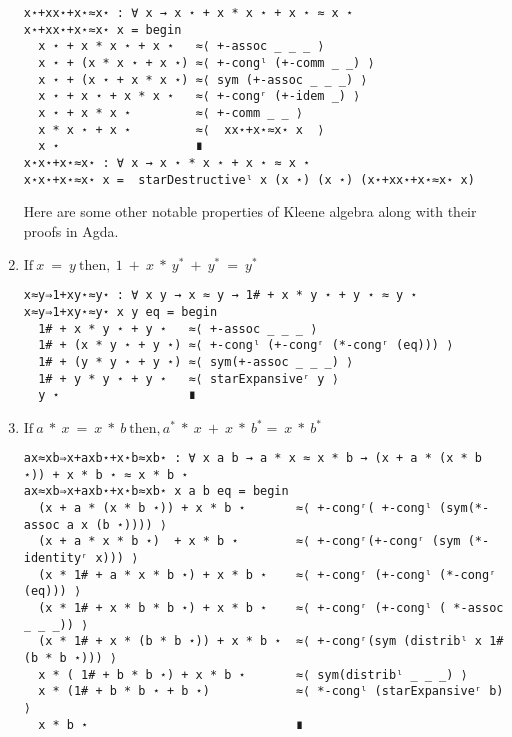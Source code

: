 \begin{enumerate}
\begin{verbatim}
x⋆+xx⋆+x⋆≈x⋆ : ∀ x → x ⋆ + x * x ⋆ + x ⋆ ≈ x ⋆
x⋆+xx⋆+x⋆≈x⋆ x = begin
  x ⋆ + x * x ⋆ + x ⋆   ≈⟨ +-assoc _ _ _ ⟩ 
  x ⋆ + (x * x ⋆ + x ⋆) ≈⟨ +-congˡ (+-comm _ _) ⟩
  x ⋆ + (x ⋆ + x * x ⋆) ≈⟨ sym (+-assoc _ _ _) ⟩ 
  x ⋆ + x ⋆ + x * x ⋆   ≈⟨ +-congʳ (+-idem _) ⟩ 
  x ⋆ + x * x ⋆         ≈⟨ +-comm _ _ ⟩
  x * x ⋆ + x ⋆         ≈⟨  xx⋆+x⋆≈x⋆ x  ⟩ 
  x ⋆                   ∎
x⋆x⋆+x⋆≈x⋆ : ∀ x → x ⋆ * x ⋆ + x ⋆ ≈ x ⋆
x⋆x⋆+x⋆≈x⋆ x =  starDestructiveˡ x (x ⋆) (x ⋆) (x⋆+xx⋆+x⋆≈x⋆ x) 
\end{verbatim}

\begin{comment}
  \item $1 \ +\ x^{*}\ *\ x^{*}\ + x^{*}\ =\ x^{*}$
\begin{verbatim}
1+x⋆x⋆+x⋆≈x⋆ : ∀ x → 1# + x ⋆ * x ⋆ + x ⋆ ≈ x ⋆
1+x⋆x⋆+x⋆≈x⋆ x = begin
  1# + x ⋆ * x ⋆ + x ⋆   ≈⟨ +-assoc _ _ _ ⟩ 
  1# + (x ⋆ * x ⋆ + x ⋆) ≈⟨ +-congˡ (x⋆x⋆+x⋆≈x⋆ x) ⟩
  1# + x ⋆               ≈⟨ 1+x⋆≈x⋆ x ⟩
  x ⋆                    ∎
\end{verbatim}
\end{comment}

Here are some other notable properties of Kleene algebra along with their proofs
in Agda.

\item $\text{If}\ x\ =\ y\ \text{then},\ 1\ +\ x\ *\ y^{*}\ + \ y^{*}\ =\ y^{*}$

\begin{verbatim}
x≈y⇒1+xy⋆≈y⋆ : ∀ x y → x ≈ y → 1# + x * y ⋆ + y ⋆ ≈ y ⋆
x≈y⇒1+xy⋆≈y⋆ x y eq = begin
  1# + x * y ⋆ + y ⋆   ≈⟨ +-assoc _ _ _ ⟩
  1# + (x * y ⋆ + y ⋆) ≈⟨ +-congˡ (+-congʳ (*-congʳ (eq))) ⟩
  1# + (y * y ⋆ + y ⋆) ≈⟨ sym(+-assoc _ _ _) ⟩ 
  1# + y * y ⋆ + y ⋆   ≈⟨ starExpansiveʳ y ⟩ 
  y ⋆                  ∎
\end{verbatim}

\item $\text{If}\ a\ *\ x\ =\ x\ *\ b\ \text{then}, a^{*}\ *\ x\ +\ x\ *\ b^{*} =\ x\ *\ b^{*}$

\begin{verbatim}
ax≈xb⇒x+axb⋆+x⋆b≈xb⋆ : ∀ x a b → a * x ≈ x * b → (x + a * (x * b ⋆)) + x * b ⋆ ≈ x * b ⋆
ax≈xb⇒x+axb⋆+x⋆b≈xb⋆ x a b eq = begin
  (x + a * (x * b ⋆)) + x * b ⋆       ≈⟨ +-congʳ( +-congˡ (sym(*-assoc a x (b ⋆)))) ⟩
  (x + a * x * b ⋆)  + x * b ⋆        ≈⟨ +-congʳ(+-congʳ (sym (*-identityʳ x))) ⟩
  (x * 1# + a * x * b ⋆) + x * b ⋆    ≈⟨ +-congʳ (+-congˡ (*-congʳ (eq))) ⟩
  (x * 1# + x * b * b ⋆) + x * b ⋆    ≈⟨ +-congʳ (+-congˡ ( *-assoc _ _ _)) ⟩
  (x * 1# + x * (b * b ⋆)) + x * b ⋆  ≈⟨ +-congʳ(sym (distribˡ x 1# (b * b ⋆))) ⟩ 
  x * ( 1# + b * b ⋆) + x * b ⋆       ≈⟨ sym(distribˡ _ _ _) ⟩ 
  x * (1# + b * b ⋆ + b ⋆)            ≈⟨ *-congˡ (starExpansiveʳ b) ⟩ 
  x * b ⋆                             ∎ 


\end{verbatim}
\end{enumerate}
